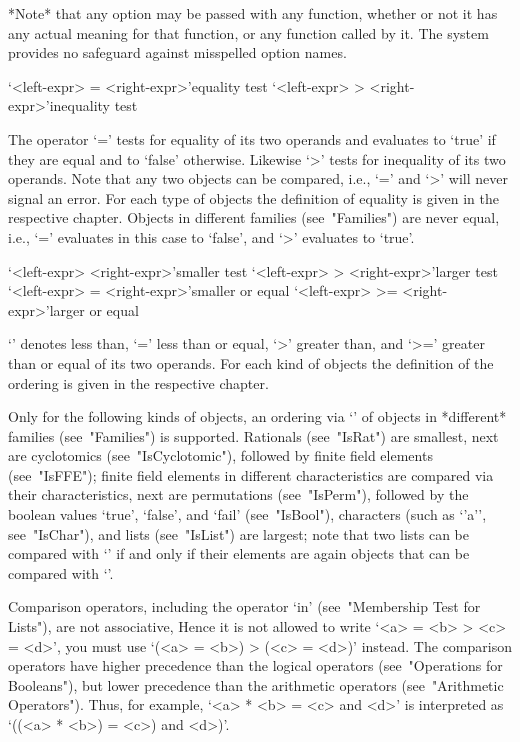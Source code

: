 {*Note* that any option may be passed with any function, whether or not 
it has any actual meaning for that function, or any function called by 
it. The system provides no safeguard against misspelled option names.


\>`<left-expr> = <right-expr>'{equality test}
\>`<left-expr> \<> <right-expr>'{inequality test}

The operator `=' tests for equality of its two operands and evaluates to
`true' if they are equal and to `false' otherwise. Likewise `\<>' tests
for inequality of its two operands. Note that any two objects can be
compared, i.e., `=' and `\<>' will never signal an error. For each type
of objects the definition of equality is given in the respective chapter.
Objects in different families (see~"Families") are never equal,
i.e., `=' evaluates in this case to `false', and `\<>' evaluates to `true'.

\>`<left-expr> \< <right-expr>'{smaller test}
\>`<left-expr> >  <right-expr>'{larger test}
\>`<left-expr> \<= <right-expr>'{smaller or equal}
\>`<left-expr> >= <right-expr>'{larger or equal}

`\<' denotes less than, `\<=' less than or equal, `>' greater than, and
`>=' greater than or equal of its two operands.
For each kind of objects the definition of the ordering is given in the
respective chapter.

Only for the following kinds of objects, an ordering via `\<' of objects
in *different* families (see~"Families") is supported.
Rationals (see~"IsRat") are smallest,
next are cyclotomics (see~"IsCyclotomic"),
followed by finite field elements (see~"IsFFE");
finite field elements in different characteristics are compared
via their characteristics,
next are permutations (see~"IsPerm"),
followed by the boolean values `true', `false', and `fail'
(see~"IsBool"),
characters (such as `{'}a{'}', see~"IsChar"),
and lists (see~"IsList") are largest;
note that two lists can be compared with `\<' if and only if their
elements are again objects that can be compared with `\<'.

Comparison operators, including the operator `in'
(see~"Membership Test for Lists"),
are not associative,
Hence it is not allowed to write `<a> = <b> \<> <c> = <d>',
you must use `(<a> = <b>) \<> (<c> = <d>)' instead.
The comparison operators have  higher precedence than the logical operators%
(see~"Operations for Booleans"), but lower precedence than the arithmetic
operators (see~"Arithmetic Operators").
Thus, for example, `<a> * <b> = <c> and <d>' is interpreted as
`((<a> * <b>) = <c>) and <d>)'.

}
